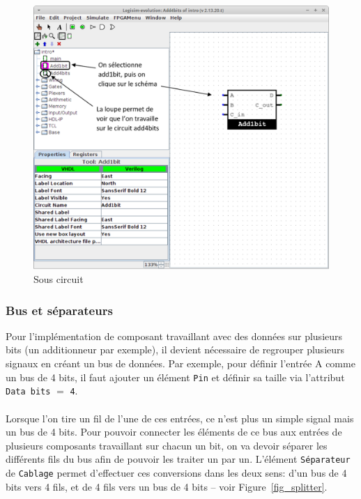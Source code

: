 \begin{figure}[H]
\begin{center}
\includegraphics[width=450pt]{pictures/logisim_sousCircuit.png}
\caption{\label{fig_sousCircuit}Sous circuit}
\end{center}
\end{figure}


\subsubsection{Bus et séparateurs}

Pour l'implémentation de composant travaillant avec des données sur plusieurs bits (un additionneur par exemple), 
il devient nécessaire de regrouper plusieurs signaux en créant un bus de données.
Par exemple, pour définir l'entrée A comme un bus de 4 bits, il
faut ajouter un élément \texttt{Pin} et définir sa taille via l'attribut \texttt{Data bits} $=$ \texttt{4}.

\paragraph{}
Lorsque l'on tire un fil de l'une de ces entrées, ce n'est plus un simple signal mais un bus de 4 bits. Pour
pouvoir connecter les éléments de ce bus aux entrées de plusieurs composants travaillant sur chacun un bit, 
on va devoir séparer les différents fils du bus afin de pouvoir les traiter un par un. L'élément \texttt{Séparateur} 
de \texttt{Cablage} permet d'effectuer ces conversions dans les deux sens: d'un bus de 4 bits vers 4 fils, 
et de 4 fils vers un bus de 4 bits -- voir Figure~\ref{fig_splitter}.

